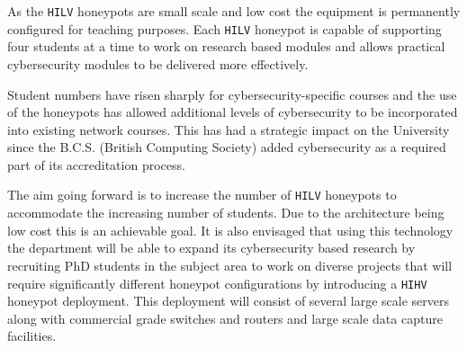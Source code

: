 \documentclass{llncs}
\begin{document}
As the \texttt{HILV} honeypots are small scale and low cost the equipment is
permanently configured for teaching purposes. Each \texttt{HILV} honeypot is
capable of supporting four students at a time to work on research based modules
and allows practical cybersecurity modules to be delivered more effectively.

Student numbers have risen sharply for cybersecurity-specific courses and the
use of the honeypots has allowed additional levels of cybersecurity to be
incorporated into existing network courses. This has had a strategic impact on
the University since the B.C.S. (British Computing Society) added
cybersecurity as a required part of its accreditation process.

The aim going forward is to increase the number of \texttt{HILV} honeypots to
accommodate the increasing number of students. Due to the architecture being
low cost this is an achievable goal. It is also envisaged that using this
technology the department will be able to expand its cybersecurity based
research by recruiting PhD students in the subject area to work on diverse
projects that will require significantly different honeypot configurations by
introducing a \texttt{HIHV} honeypot deployment. This deployment will consist
of several large scale servers along with commercial grade switches and routers
and large scale data capture facilities.




\end{document}
